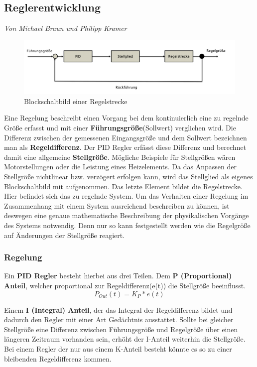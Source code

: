 \documentclass[12pt,a4paper,bibliography=totoc,listof=totoc]{scrartcl}
\begin{document}
\subsection{Reglerentwicklung}
\textit{Von Michael Braun und Philipp Kramer}\newline

\begin{figure}[htbp]
	\centering
	\includegraphics[scale = 0.4]{pics/Regelung}
	\caption{Blockschaltbild einer Regelstrecke}
	\label{Regelung}
\end{figure}

Eine Regelung beschreibt einen Vorgang bei dem kontinuierlich eine zu regelnde Größe erfasst und mit einer \textbf{Führungsgröße}(Sollwert) verglichen wird.
Die Differenz zwischen der gemessenen Eingangsgröße und dem Sollwert bezeichnen man als \textbf{Regeldifferenz}. 
Der PID Regler erfässt diese Differenz und berechnet damit eine allgemeine \textbf{Stellgröße}.
Mögliche Beispiele für Stellgrößen wären Motorstellungen oder die Leistung eines Heizelements.
Da das Anpassen der Stellgröße nichtlinear bzw. verzögert erfolgen kann, wird das Stellglied als eigenes Blockschaltbild mit aufgenommen. 
Das letzte Element bildet die Regelstrecke. Hier befindet sich das zu regelnde System. Um das Verhalten einer Regelung im Zusammenhang mit einem System ausreichend beschreiben zu können, ist deswegen eine genaue mathematische Beschreibung der physikalischen Vorgänge des Systems notwendig. Denn nur so kann festgestellt werden wie die Regelgröße auf Änderungen der Stellgröße reagiert.

\subsubsection{Regelung}
Ein \textbf{PID Regler} besteht hierbei aus drei Teilen.\newline
Dem \textbf{P (Proportional) Anteil}, welcher proportional zur Regeldifferenz(e(t)) die Stellgröße beeinflusst.
\begin{equation} 
P_{Out}(t) = K_P*e(t)
\end{equation}

Einem \textbf{I (Integral) Anteil}, der das Integral der Regeldifferenz bildet und dadurch den Regler mit einer Art Gedächtnis ausstattet. Sollte bei gleicher Stellgröße eine Differenz zwischen Führungsgröße und Regelgröße über einen längeren Zeitraum vorhanden sein, erhöht der I-Anteil weiterhin die Stellgröße. Bei einem Regler der nur aus einem K-Anteil besteht könnte es so zu einer bleibenden Regeldifferenz kommen.
\end{document}
